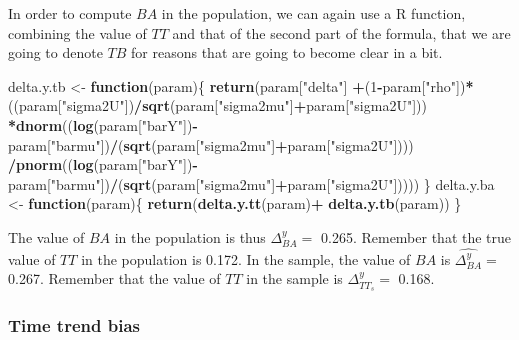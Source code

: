 \documentclass[]{book}
\newenvironment{Shaded}{\begin{snugshade}}{\end{snugshade}}
\newcommand{\KeywordTok}[1]{\textcolor[rgb]{0.13,0.29,0.53}{\textbf{#1}}}
\newcommand{\DecValTok}[1]{\textcolor[rgb]{0.00,0.00,0.81}{#1}}
\newcommand{\StringTok}[1]{\textcolor[rgb]{0.31,0.60,0.02}{#1}}
\newcommand{\ControlFlowTok}[1]{\textcolor[rgb]{0.13,0.29,0.53}{\textbf{#1}}}
\newcommand{\OperatorTok}[1]{\textcolor[rgb]{0.81,0.36,0.00}{\textbf{#1}}}
\newcommand{\NormalTok}[1]{#1}
\theoremstyle{definition}
\theoremstyle{definition}
\theoremstyle{definition}
\theoremstyle{remark}
\begin{document}
In order to compute \(BA\) in the population, we can again use a R
function, combining the value of \(TT\) and that of the second part of
the formula, that we are going to denote \(TB\) for reasons that are
going to become clear in a bit.

\begin{Shaded}
\begin{Highlighting}[]
\NormalTok{delta.y.tb <-}\StringTok{ }\ControlFlowTok{function}\NormalTok{(param)\{}
  \KeywordTok{return}\NormalTok{(param[}\StringTok{"delta"}\NormalTok{]}
          \OperatorTok{+}\NormalTok{(}\DecValTok{1}\OperatorTok{-}\NormalTok{param[}\StringTok{"rho"}\NormalTok{])}\OperatorTok{*}\NormalTok{((param[}\StringTok{"sigma2U"}\NormalTok{])}\OperatorTok{/}\KeywordTok{sqrt}\NormalTok{(param[}\StringTok{"sigma2mu"}\NormalTok{]}\OperatorTok{+}\NormalTok{param[}\StringTok{"sigma2U"}\NormalTok{]))}
         \OperatorTok{*}\KeywordTok{dnorm}\NormalTok{((}\KeywordTok{log}\NormalTok{(param[}\StringTok{"barY"}\NormalTok{])}\OperatorTok{-}\NormalTok{param[}\StringTok{"barmu"}\NormalTok{])}\OperatorTok{/}\NormalTok{(}\KeywordTok{sqrt}\NormalTok{(param[}\StringTok{"sigma2mu"}\NormalTok{]}\OperatorTok{+}\NormalTok{param[}\StringTok{"sigma2U"}\NormalTok{])))}
         \OperatorTok{/}\KeywordTok{pnorm}\NormalTok{((}\KeywordTok{log}\NormalTok{(param[}\StringTok{"barY"}\NormalTok{])}\OperatorTok{-}\NormalTok{param[}\StringTok{"barmu"}\NormalTok{])}\OperatorTok{/}\NormalTok{(}\KeywordTok{sqrt}\NormalTok{(param[}\StringTok{"sigma2mu"}\NormalTok{]}\OperatorTok{+}\NormalTok{param[}\StringTok{"sigma2U"}\NormalTok{]))))}
\NormalTok{\}}
\NormalTok{delta.y.ba <-}\StringTok{ }\ControlFlowTok{function}\NormalTok{(param)\{}
  \KeywordTok{return}\NormalTok{(}\KeywordTok{delta.y.tt}\NormalTok{(param)}\OperatorTok{+}\StringTok{ }\KeywordTok{delta.y.tb}\NormalTok{(param))}
\NormalTok{\}}
\end{Highlighting}
\end{Shaded}

The value of \(BA\) in the population is thus \(\Delta^y_{BA}=\) 0.265.
Remember that the true value of \(TT\) in the population is 0.172. In
the sample, the value of \(BA\) is \(\hat{\Delta^y_{BA}}=\) 0.267.
Remember that the value of \(TT\) in the sample is \(\Delta^y_{TT_s}=\)
0.168.

\subsubsection{Time trend bias}\label{time-trend-bias}
\end{document}
